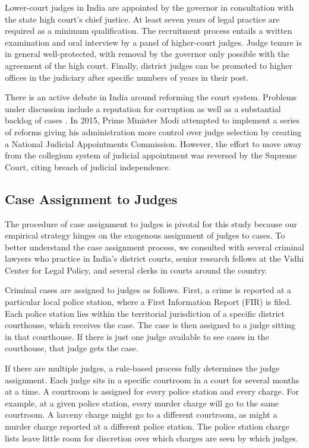 \documentclass[12pt,english]{article}
\begin{document}
Lower-court judges in India are appointed by the governor in consultation with the state high court's chief justice. At least seven years of legal practice are required as a  minimum qualification. The recruitment process entails a written examination and oral interview by a panel of higher-court judges. Judge tenure is in general well-protected, with removal by the governor only possible with the agreement of the high court. Finally,  district judges can be promoted to higher offices in the judiciary after specific numbers of years in their post.

There is an active debate in India around reforming the court system. Problems under discussion include a reputation for corruption \citep{AtulDev_2019} as well as a substantial backlog of cases \citep{trusts2019india}. In 2015, Prime Minister Modi attempted to implement a series of reforms giving his administration more control over judge selection by creating a National Judicial Appointments Commission. However, the effort to move away from the collegium system of judicial appointment was reversed by the Supreme Court, citing breach of judicial independence. 

\subsection{Case Assignment to Judges}

The procedure of case assignment to judges is pivotal for this study because our empirical strategy hinges on the exogenous assignment of judges to cases. To better understand the case assignment process, we consulted with several criminal lawyers who practice in India's district courts, senior research fellows at the Vidhi Center for Legal Policy, and several clerks in courts around the country. 

Criminal cases are assigned to judges as follows. First, a crime is reported at a particular local  police station, where a First Information Report (FIR) is filed. Each police station lies within the territorial jurisdiction of a specific district courthouse, which receives the case. The case is then assigned to a judge sitting in that courthouse. If there is just one judge available to see cases in the courthouse, that judge gets the case.

If there are multiple judges, a rule-based process fully determines the judge assignment. Each judge sits in a specific courtroom in a court for several months at a time. A courtroom is assigned for every police station and every charge. For example, at a given police station, every murder charge will go to the same courtroom. A larceny charge might go to a different courtroom, as might a murder charge reported at a different police station. The police station charge lists leave little room for discretion over which charges are seen by which judges. 
\end{document}
